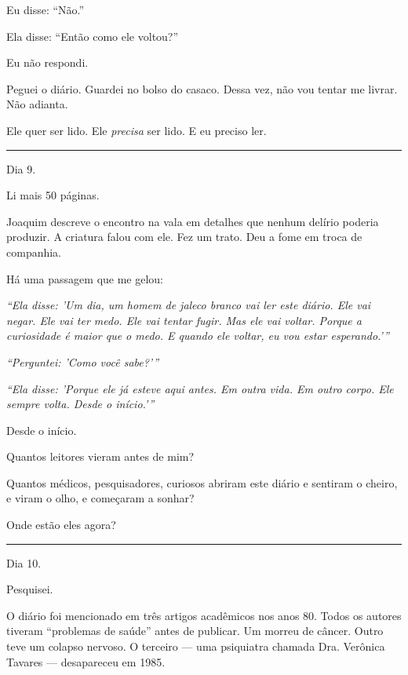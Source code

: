 \noindent Eu disse: \textquotedblleft{}Não.\textquotedblright{}

\noindent Ela disse: \textquotedblleft{}Então como ele voltou?\textquotedblright{}

\noindent Eu não respondi.

\noindent Peguei o diário. Guardei no bolso do casaco. Dessa vez, não vou tentar me livrar. Não adianta.

\noindent Ele quer ser lido.
Ele \textit{precisa} ser lido.
E eu preciso ler.

\vspace{0.5em}\noindent\rule{\textwidth}{0.5pt}\vspace{0.5em}

\noindent Dia 9.

\noindent Li mais 50 páginas.

\noindent Joaquim descreve o encontro na vala em detalhes que nenhum delírio poderia produzir. A criatura falou com ele. Fez um trato. Deu a fome em troca de companhia.

\noindent Há uma passagem que me gelou:

\noindent \textit{\textquotedblleft{}Ela disse: 'Um dia, um homem de jaleco branco vai ler este diário. Ele vai negar. Ele vai ter medo. Ele vai tentar fugir. Mas ele vai voltar. Porque a curiosidade é maior que o medo. E quando ele voltar, eu vou estar esperando.'\textquotedblright{}}

\noindent \textit{\textquotedblleft{}Perguntei: 'Como você sabe?'\textquotedblright{}}

\noindent \textit{\textquotedblleft{}Ela disse: 'Porque ele já esteve aqui antes. Em outra vida. Em outro corpo. Ele sempre volta. Desde o início.'\textquotedblright{}}

\noindent Desde o início.

\noindent Quantos leitores vieram antes de mim?

\noindent Quantos médicos, pesquisadores, curiosos abriram este diário e sentiram o cheiro, e viram o olho, e começaram a sonhar?

\noindent Onde estão eles agora?

\vspace{0.5em}\noindent\rule{\textwidth}{0.5pt}\vspace{0.5em}

\noindent Dia 10.

\noindent Pesquisei.

\noindent O diário foi mencionado em três artigos acadêmicos nos anos 80. Todos os autores tiveram \textquotedblleft{}problemas de saúde\textquotedblright{} antes de publicar. Um morreu de câncer. Outro teve um colapso nervoso. O terceiro --- uma psiquiatra chamada Dra. Verônica Tavares --- desapareceu em 1985.

